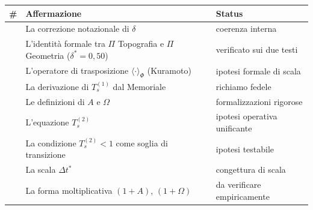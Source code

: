 {\def\LTcaptype{none} %
{\small\begin{longtable}[]{@{}
  >{\raggedright\arraybackslash}p{}
  >{\raggedright\arraybackslash}p{}
  >{\raggedright\arraybackslash}p{}@{}}
\toprule\noalign{}
\begin{minipage}[b]{\linewidth}\raggedright
\#
\end{minipage} & \begin{minipage}[b]{\linewidth}\raggedright
Affermazione
\end{minipage} & \begin{minipage}[b]{\linewidth}\raggedright
Status
\end{minipage} \\
\midrule\noalign{}
\endhead
\bottomrule\noalign{}
\endlastfoot
1 & La correzione notazionale di \(\delta\) & \Proved{} coerenza
interna \\
2 & L'identità formale tra \(\Pi\) Topografia e \(\Pi\) Geometria
(\(\delta^*=0{,}50\)) & \Proved{} verificato sui due testi \\
3 & L'operatore di trasposizione \(\langle\cdot\rangle_\Phi\) (Kuramoto)
& \Hypoth{} ipotesi formale di scala \\
4 & La derivazione di \(T_s^{(1)}\) dal Memoriale & \Proved{} richiamo
fedele \\
5 & Le definizioni di \(A\) e \(\Omega\) & \Proved{} formalizzazioni
rigorose \\
6 & L'equazione \(T_s^{(2)}\) & \Hypoth{} ipotesi operativa
unificante \\
7 & La condizione \(T_s^{(2)} < 1\) come soglia di transizione &
\Hypoth{} ipotesi testabile \\
8 & La scala \(\Delta t^*\) & \Conj{} congettura di scala \\
9 & La forma moltiplicativa \((1+A)\), \((1+\Omega)\) & \ToVerify{} da
verificare empiricamente \\
\end{longtable}}
}


